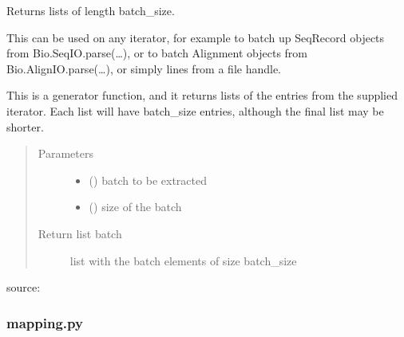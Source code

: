 \documentclass[letterpaper,10pt,english]{sphinxmanual}
\begin{document}

\begin{fulllineitems}
\label{\detokenize{_autosummary/graphdb_builder:graphdb_builder.builder_utils.batch_iterator}}
Returns lists of length batch\_size.

This can be used on any iterator, for example to batch up
SeqRecord objects from Bio.SeqIO.parse(…), or to batch
Alignment objects from Bio.AlignIO.parse(…), or simply
lines from a file handle.

This is a generator function, and it returns lists of the
entries from the supplied iterator.  Each list will have
batch\_size entries, although the final list may be shorter.
\begin{quote}\begin{description}
\item[{Parameters}] \leavevmode\begin{itemize}
\item {} 
 () \textendash{} batch to be extracted

\item {} 
 () \textendash{} size of the batch

\end{itemize}

\item[{Return list batch}] \leavevmode
list with the batch elements of size batch\_size

\end{description}\end{quote}

source: 

\end{fulllineitems}



\subsubsection{mapping.py}
\label{\detokenize{_autosummary/graphdb_builder:module-graphdb_builder.mapping}}\label{\detokenize{_autosummary/graphdb_builder:mapping-py}}
\end{document}
